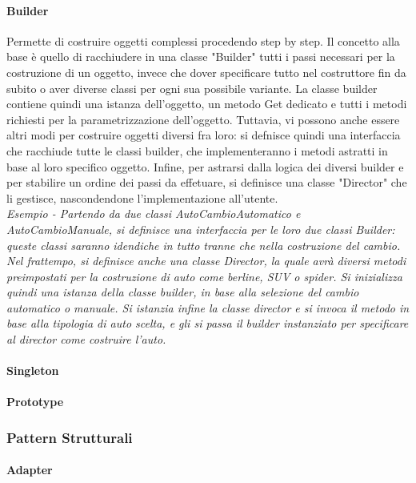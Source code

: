 \documentclass{article}
\begin{document}
            \paragraph{Builder} Permette di costruire oggetti complessi procedendo step by step.
                Il concetto alla base è quello di racchiudere in una classe "Builder" tutti i passi necessari per la costruzione di un oggetto, invece che dover specificare tutto nel costruttore fin da subito o aver diverse classi per ogni sua possibile variante.
                La classe builder contiene quindi una istanza dell'oggetto, un metodo Get dedicato e tutti i metodi richiesti per la parametrizzazione dell'oggetto.
                Tuttavia, vi possono anche essere altri modi per costruire oggetti diversi fra loro: si defnisce quindi una interfaccia che racchiude tutte le classi builder, che implementeranno i metodi astratti in base al loro specifico oggetto.
                Infine, per astrarsi dalla logica dei diversi builder e per stabilire un ordine dei passi da effetuare, si definisce una classe "Director" che li gestisce, nascondendone l'implementazione all'utente.\\
                \textit{Esempio - Partendo da due classi AutoCambioAutomatico e AutoCambioManuale, si definisce una interfaccia per le loro due classi Builder: queste classi saranno idendiche in tutto tranne che nella costruzione del cambio.
                    Nel frattempo, si definisce anche una classe Director, la quale avrà diversi metodi preimpostati per la costruzione di auto come berline, SUV o spider.
                    Si inizializza quindi una istanza della classe builder, in base alla selezione del cambio automatico o manuale.
                    Si istanzia infine la classe director e si invoca il metodo in base alla tipologia di auto scelta, e gli si passa il builder instanziato per specificare al director come costruire l'auto.
                }

            \paragraph{Singleton}
            \paragraph{Prototype}
        \subsubsection{Pattern Strutturali}
            \paragraph{Adapter}
\end{document}
